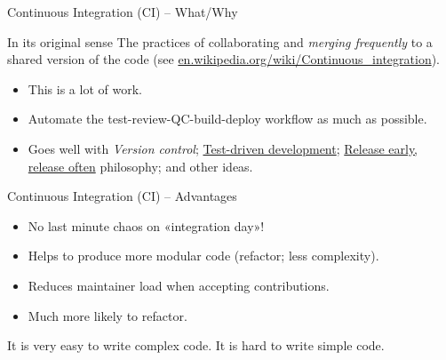 \documentclass[aspectratio=169]{beamer}
\begin{document}
\begin{frame}
  {Continuous Integration (CI) -- What/Why}

  \begin{block}{In its original sense}
    The practices of collaborating and \emph{merging frequently} to a shared
    version of the code (see
    \href{https://en.wikipedia.org/wiki/Continuous_integration}%
    {en.wikipedia.org/wiki/Continuous\_integration}).
  \end{block}

  \begin{itemize}
    \item This is a lot of work.
    \item Automate the test-review-QC-build-deploy workflow as much as possible.
    \item Goes well with \emph{Version control};
      \href{https://en.wikipedia.org/wiki/Test-driven_development}%
      {Test-driven development};
      \href{https://en.wikipedia.org/wiki/Release_early,_release_often}%
      {Release early, release often} philosophy; and other ideas.
  \end{itemize}

\end{frame}

\begin{frame}
  {Continuous Integration (CI) -- Advantages}

  \begin{itemize}
    \item No last minute chaos on «integration day»!
    \item Helps to produce more modular code (refactor; less complexity).
    \item Reduces maintainer load when accepting contributions.
    \item Much more likely to refactor.
  \end{itemize}

  \center
  \alert{It is very easy to write complex code. It is hard to write simple
  code.}

\end{frame}
\end{document}
